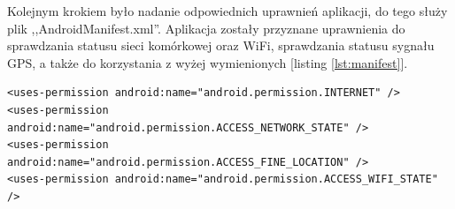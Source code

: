 \documentclass[eng,printmode,oneside]{mgr}
\begin{document}
Kolejnym krokiem było nadanie odpowiednich uprawnień aplikacji, do tego służy
plik ,,AndroidManifest.xml''. Aplikacja zostały przyznane uprawnienia do
sprawdzania statusu sieci komórkowej oraz WiFi, sprawdzania statusu sygnału
GPS, a także do korzystania z wyżej wymienionych [listing \ref{lst:manifest}].

\begin{lstlisting}[caption=Nadanie uprawnień aplikacji
Android w pliku AndroidManifest.xml,label=lst:manifest] 
<uses-permission android:name="android.permission.INTERNET" />
<uses-permission android:name="android.permission.ACCESS_NETWORK_STATE" />
<uses-permission android:name="android.permission.ACCESS_FINE_LOCATION" />
<uses-permission android:name="android.permission.ACCESS_WIFI_STATE" />
\end{lstlisting}
\end{document}
